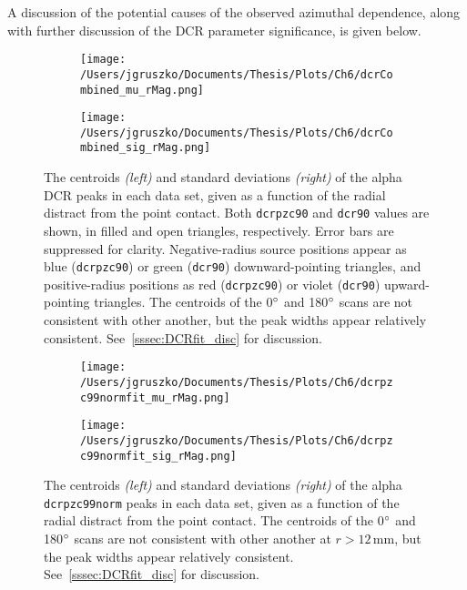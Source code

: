 A discussion of the potential causes of the observed azimuthal dependence, along with further discussion of the DCR parameter significance, is given below. 

\begin{figure*}[]
 \centering
 \begin{subfigure}[]{\textwidth}
 \centering
 \texttt{[image: /Users/jgruszko/Documents/Thesis/Plots/Ch6/dcrCombined\_mu\_rMag.png]}
\end{subfigure}
 \begin{subfigure}[]{\textwidth}
  \centering
 \texttt{[image: /Users/jgruszko/Documents/Thesis/Plots/Ch6/dcrCombined\_sig\_rMag.png]}
\end{subfigure}
 \caption[{\tt dcrpzc90} and {\tt dcr90} fit results as a function of distance from the point contact]{The centroids {\it (left)} and standard deviations {\it (right)} of the alpha DCR peaks in each data set, given as a function of the radial distract from the point contact. Both {\tt dcrpzc90} and {\tt dcr90} values are shown, in filled and open triangles, respectively. Error bars are suppressed for clarity. Negative-radius source positions appear as blue ({\tt dcrpzc90}) or green ({\tt dcr90}) downward-pointing triangles, and positive-radius positions as red ({\tt dcrpzc90}) or violet ({\tt dcr90}) upward-pointing triangles. The centroids of the 0$\degree$ and 180$\degree$ scans are not consistent with other another, but the peak widths appear relatively consistent. See~\ref{sssec:DCRfit_disc} for discussion.} 
 \label{fig:DCRfit_rMag}
\end{figure*}

\begin{figure*}[]
 \centering
 \begin{subfigure}[]{\textwidth}
 \centering
 \texttt{[image: /Users/jgruszko/Documents/Thesis/Plots/Ch6/dcrpzc99normfit\_mu\_rMag.png]}
\end{subfigure}
 \begin{subfigure}[]{\textwidth}
  \centering
 \texttt{[image: /Users/jgruszko/Documents/Thesis/Plots/Ch6/dcrpzc99normfit\_sig\_rMag.png]}
\end{subfigure}
 \caption[{\tt dcrpzc9norm} fit results as a function of distance from the point contact]{The centroids {\it (left)} and standard deviations {\it (right)} of the alpha {\tt dcrpzc99norm} peaks in each data set, given as a function of the radial distract from the point contact. The centroids of the 0$\degree$ and 180$\degree$ scans are not consistent with other another at $r>12$\,mm, but the peak widths appear relatively consistent. See~\ref{sssec:DCRfit_disc} for discussion.} 
 \label{fig:dcrNormFit_rMag}
\end{figure*}

